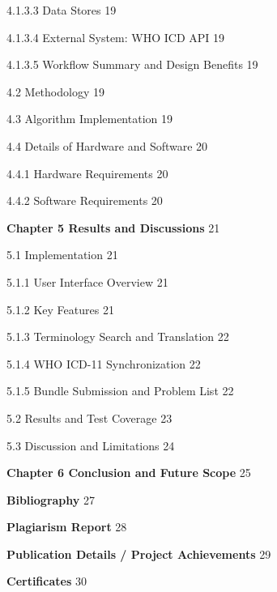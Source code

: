 \documentclass[12pt,a4paper,oneside]{report}
\begin{document}
4.1.3.3 Data Stores	19

4.1.3.4 External System: WHO ICD API	19

4.1.3.5 Workflow Summary and Design Benefits	19

4.2 Methodology	19

4.3 Algorithm Implementation	19

4.4 Details of Hardware and Software	20

4.4.1 Hardware Requirements	20

4.4.2 Software Requirements	20

\textbf{Chapter 5  Results and Discussions}	21

5.1 Implementation	21

5.1.1 User Interface Overview	21

5.1.2 Key Features	21

5.1.3 Terminology Search and Translation	22

5.1.4 WHO ICD-11 Synchronization	22

5.1.5 Bundle Submission and Problem List	22

5.2 Results and Test Coverage	23

5.3 Discussion and Limitations	24

\textbf{Chapter 6  Conclusion and Future Scope}	25

\textbf{Bibliography}	27

\textbf{Plagiarism Report}	28

\textbf{Publication Details / Project Achievements}	29

\textbf{Certificates}	30
\end{document}
